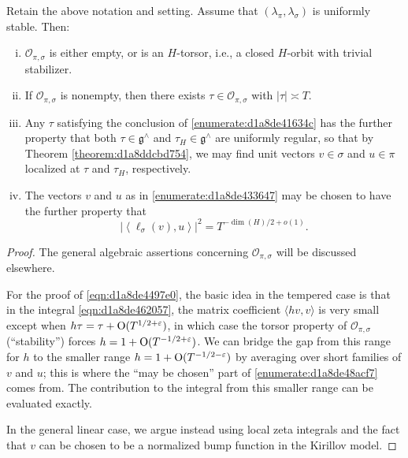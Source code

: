 \documentclass[reqno]{amsart} 
\numberwithin{equation}{section}
\begin{document}
\begin{theorem}
  Retain the above notation and setting.  Assume that $(\lambda_\pi, \lambda_\sigma)$ is uniformly stable.  Then:
  \begin{enumerate}[(i)]
  \item $\mathcal{O}_{\pi,\sigma}$ is either empty, or is an $H$-torsor, i.e., a closed $H$-orbit with trivial stabilizer.
  \item\label{enumerate:d1a8de41634c} If $\mathcal{O}_{\pi,\sigma}$ is nonempty, then there exists $\tau \in \mathcal{O}_{\pi,\sigma}$ with $\lvert \tau \rvert \asymp T$.
  \item\label{enumerate:d1a8de433647} Any $\tau$ satisfying the conclusion of \eqref{enumerate:d1a8de41634c} has the further property that both $\tau \in \mathfrak{g}^\wedge$ and $\tau_H \in \mathfrak{g}^\wedge$ are uniformly regular, so that by Theorem \ref{theorem:d1a8ddcbd754}, we may find unit vectors $v \in \sigma$ and $u \in \pi$ localized at $\tau$ and $\tau_H$, respectively.
  \item\label{enumerate:d1a8de48acf7} The vectors $v$ and $u$ as in \eqref{enumerate:d1a8de433647} may be chosen to have the further property that
\begin{equation}\label{eqn:d1a8de4497e0}
\left\lvert \left\langle \ell_\sigma(v), u \right\rangle \right\rvert^2 = T^{-\dim(H)/2 + o(1)}.
\end{equation}    
  \end{enumerate}
\end{theorem}
\begin{proof}
  The general algebraic assertions concerning $\mathcal{O}_{\pi,\sigma}$ will be discussed elsewhere.

  For the proof of \eqref{eqn:d1a8de4497e0}, the basic idea in the tempered case is that in the integral \eqref{eqn:d1a8de462057}, the matrix coefficient $\langle h v, v \rangle$ is very small except when $h \tau = \tau + \operatorname{O}(T^{1/2+\varepsilon})$, in which case the torsor property of $\mathcal{O}_{\pi,\sigma}$ (``stability'') forces $h = 1 + \operatorname{O}(T^{-1/2+\varepsilon})$.  We can bridge the gap from this range for $h$ to the smaller range $h = 1 + \operatorname{O}(T^{-1/2-\varepsilon})$ by averaging over short families of $v$ and $u$; this is where the ``may be chosen'' part of \eqref{enumerate:d1a8de48acf7} comes from.  The contribution to the integral from this smaller range can be evaluated exactly.

  In the general linear case, we argue instead using local zeta integrals and the fact that $v$ can be chosen to be a normalized bump function in the Kirillov model.
\end{proof}





{} 
\end{document}
